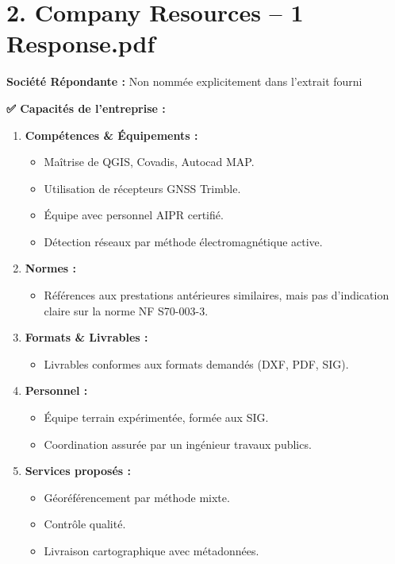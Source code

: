 \documentclass[a4paper,12pt]{article}
\begin{document}
\section*{2. Company Resources -- 1 Response.pdf}

\textbf{Société Répondante :} Non nommée explicitement dans l'extrait fourni

\vspace{0.5cm}

\textbf{✅ Capacités de l'entreprise :}

\begin{enumerate}[label=\arabic*.]

\item \textbf{Compétences \& Équipements :}

\begin{itemize}
  \item Maîtrise de QGIS, Covadis, Autocad MAP.
  \item Utilisation de récepteurs GNSS Trimble.
  \item Équipe avec personnel AIPR certifié.
  \item Détection réseaux par méthode électromagnétique active.
\end{itemize}

\item \textbf{Normes :}

\begin{itemize}
  \item Références aux prestations antérieures similaires, mais pas d'indication claire sur la norme NF S70-003-3.
\end{itemize}

\item \textbf{Formats \& Livrables :}

\begin{itemize}
  \item Livrables conformes aux formats demandés (DXF, PDF, SIG).
\end{itemize}

\item \textbf{Personnel :}

\begin{itemize}
  \item Équipe terrain expérimentée, formée aux SIG.
  \item Coordination assurée par un ingénieur travaux publics.
\end{itemize}

\item \textbf{Services proposés :}

\begin{itemize}
  \item Géoréférencement par méthode mixte.
  \item Contrôle qualité.
  \item Livraison cartographique avec métadonnées.
\end{itemize}

\end{enumerate}
\end{document}
